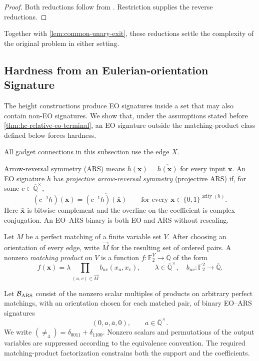 \documentclass[11pt,letterpaper,onecolumn]{article}
\theoremstyle{plain}
\theoremstyle{definition}
\theoremstyle{remark}
\newcommand{\AlgNums}{\overline{\mathbb Q}}
\newcommand{\Ftwo}{\mathbb F_2}
\newcommand{\arity}{\operatorname{arity}}
\newcommand{\Neq}{\neq}
\begin{document}
	\begin{proof}
		Both reductions follow from \cite[Corollary~3.6]{Liu2026DEQ2Holant}.
		Restriction supplies the reverse reductions.
	\end{proof}

Together with \cref{lem:common-unary-exit}, these reductions settle the
		complexity of the original problem in either setting.
	
	\subsection{Hardness from an Eulerian-orientation Signature}
	\label{subsec:hc-relative-eo}

The height constructions produce EO signatures inside a set that may
also contain non-EO signatures. We show that, under the assumptions stated
before \cref{thm:hc-relative-eo-terminal}, an EO signature outside the
matching-product class defined below forces hardness.

	All gadget connections in this subsection use the edge \(X\).

	Arrow-reversal symmetry (ARS) means
	\(h({\mathbf x})=\overline{h(\bar {\mathbf x})}\) for every input \({\mathbf x}\).
	An EO signature \(h\) has \emph{projective arrow-reversal symmetry}
	(projective ARS) if, for some \(c\in\AlgNums^\times\),
	\[
	(c^{-1}h)({\mathbf x})=\overline{(c^{-1}h)(\bar {\mathbf x})}
	\qquad\text{for every \({\mathbf x}\in\{0,1\}^{\arity(h)}\)}.
	\]
	Here \(\bar {\mathbf x}\) is bitwise complement and the overline on the coefficient is
	complex conjugation.  An EO--ARS binary is both EO and ARS without rescaling.

	Let \(M\) be a perfect matching of a finite variable set \(V\).
	After choosing an orientation of every edge, write \(\vec M\) for
	the resulting set of ordered pairs.  A nonzero \emph{matching product} on
	\(V\) is a function \(f:\Ftwo^V\to\AlgNums\) of the form
	\[
	f({\mathbf x})=\lambda\prod_{(u,v)\in\vec M}b_{uv}(x_u,x_v),
	\qquad
	\lambda\in\AlgNums^\times,
	\quad b_{uv}:\Ftwo^2\to\AlgNums.
	\]

	Let \(\mathcal B_{\rm ARS}\) consist of the nonzero scalar multiples of
	products on arbitrary perfect matchings, with an orientation chosen for each
	matched pair, of binary EO--ARS signatures
	\begin{equation}
		(0,a,\overline a,0),\qquad a\in\AlgNums^\times.
		\label{eq:hc-rel-B}
	\end{equation}
	We write
	\((\Neq_4)=\delta_{0011}+\delta_{1100}\).
	Nonzero scalars and permutations of the output variables are suppressed according to the
	equivalence convention.  The required matching-product factorization constrains both the support and the coefficients.
\end{document}
